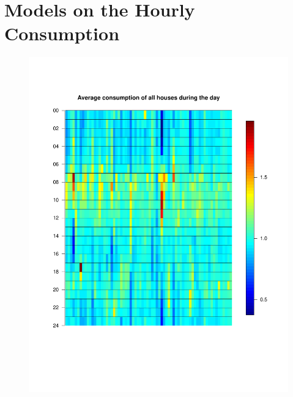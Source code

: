 \chapter{Models on the Hourly Consumption}






\begin{figure}
    \centering
    \includegraphics[width=.8\textwidth]{../../../figures/Heatmap.pdf}
    \caption{}
    \label{fig: daily_cons}
\end{figure}